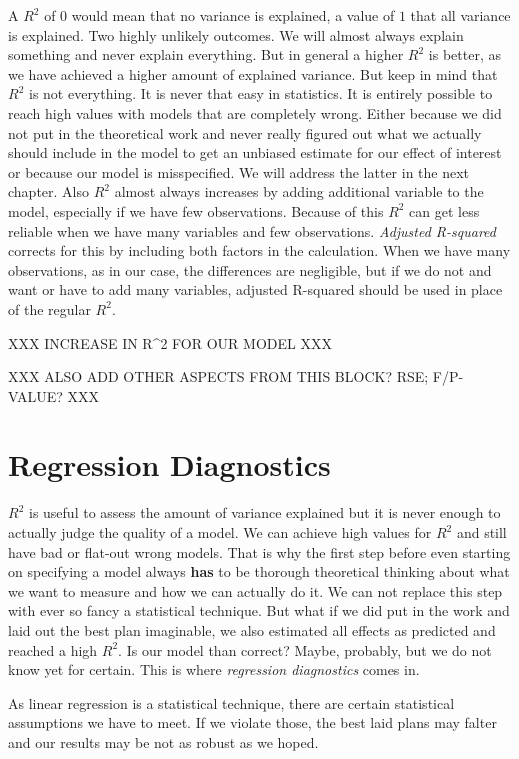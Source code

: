 \documentclass[
]{book}
\begin{document}
A \(R^2\) of \(0\) would mean that no variance is explained, a value of \(1\) that all
variance is explained. Two highly unlikely outcomes. We will almost always
explain something and never explain everything. But in general a higher \(R^2\) is
better, as we have achieved a higher amount of explained variance. But keep in
mind that \(R^2\) is not everything. It is never that easy in statistics. It is
entirely possible to reach high values with models that are completely wrong.
Either because we did not put in the theoretical work and never really figured
out what we actually should include in the model to get an unbiased estimate for
our effect of interest or because our model is misspecified. We will address the
latter in the next chapter.
Also \(R^2\) almost always increases by adding additional variable to the model,
especially if we have few observations. Because of this \(R^2\) can get less
reliable when we have many variables and few observations. \emph{Adjusted R-squared}
corrects for this by including both factors in the calculation. When we have
many observations, as in our case, the differences are negligible, but if we do
not and want or have to add many variables, adjusted R-squared should be used in
place of the regular \(R^2\).

XXX INCREASE IN R\^{}2 FOR OUR MODEL XXX

XXX ALSO ADD OTHER ASPECTS FROM THIS BLOCK? RSE; F/P-VALUE? XXX

\hypertarget{regression-diagnostics}{%
\section{Regression Diagnostics}\label{regression-diagnostics}}

\(R^2\) is useful to assess the amount of variance explained but it is never
enough to actually judge the quality of a model. We can achieve high values for
\(R^2\) and still have bad or flat-out wrong models.
That is why the first step before even starting on specifying a model always
\textbf{has} to be thorough theoretical thinking about what we want to measure and
how we can actually do it. We can not replace this step with ever so fancy a
statistical technique.
But what if we did put in the work and laid out the best plan imaginable, we
also estimated all effects as predicted and reached a high \(R^2\). Is our model
than correct? Maybe, probably, but we do not know yet for certain. This is where
\emph{regression diagnostics} comes in.

As linear regression is a statistical technique, there are certain statistical
assumptions we have to meet. If we violate those, the best laid plans may
falter and our results may be not as robust as we hoped.
\end{document}
